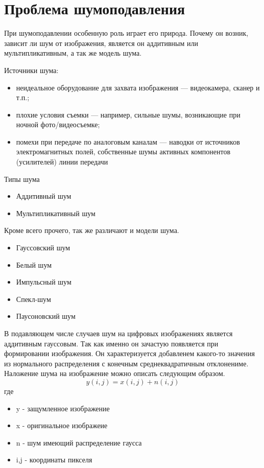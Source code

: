 \graphicspath{{../images/}}
\section{Проблема шумоподавления}
При шумоподавлении особенную роль играет его природа. Почему он возник, зависит ли шум от изображения, является он аддитивным
или мультипликативным, а так же модель шума. 

Источники шума\cite{Gonzalez}:
\begin{itemize}
	\item неидеальное оборудование для захвата изображения — видеокамера, сканер и
	т.п.;
	\item плохие условия съемки — например, сильные шумы, возникающие при
	ночной фото/видеосъемке;
	\item помехи при передаче по аналоговым каналам — наводки от источников
	электромагнитных полей, собственные шумы активных компонентов
	(усилителей) линии передачи
\end{itemize}

Типы шума
\begin{itemize}
	\item Аддитивный шум
	\item Мультипликативный шум
\end{itemize}

Кроме всего прочего, так же различают и модели шума.
\begin{itemize}
	\item Гауссовский шум
	\item Белый шум
	\item Импульсный шум
	\item Спекл-шум
	\item Паусоновский шум
\end{itemize}

В подавляющем числе случаев шум на цифровых изображениях является аддитивным гауссовым. Так
как именно он зачастую появляется при формировании изображения. Он характеризуется добавленем какого-то
значения из нормального распределения с конечным среднеквадратичным отклонениме. Наложение шума
на изображение можно описать следующим образом.
\begin{equation}\label{eModelNoise}
	y(i,j)=x(i,j)+n(i,j)
\end{equation}
где
\begin{itemize}
	\item y - защумленное изображение
	\item x - оригинальное изображеие
	\item n - шум имеющий распределение гаусса
	\item i,j - координаты пикселя
\end{itemize}

